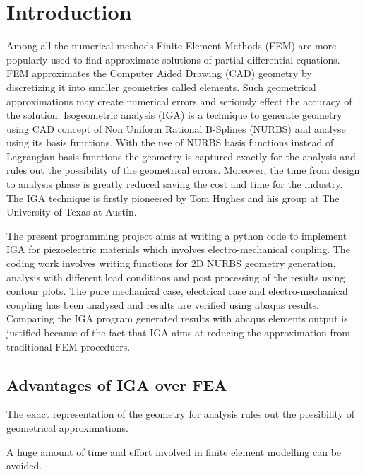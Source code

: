 \documentclass[11pt]{article}
\begin{document}
\section{Introduction}
Among all the numerical methods Finite Element Methods (FEM) are more popularly
used to find approximate solutions of partial differential equations. FEM
approximates the Computer Aided Drawing (CAD) geometry by discretizing it into
smaller geometries called elements. Such geometrical approximations may create
numerical errors and seriously effect the accuracy of the solution.
Isogeometric analysis (IGA) is a technique to generate geometry using CAD
concept of Non Uniform Rational B-Splines (NURBS) and analyse using its basis
functions.
With the use of NURBS basis functions instead of Lagrangian basis functions the geometry is captured exactly for the analysis and rules out the possibility of the geometrical errors. Moreover, the time from design to analysis phase is greatly reduced saving the cost and time for the industry.
The IGA technique is firstly pioneered by Tom Hughes and his group at The
University of Texas at Austin.\\
\par
The present programming project aims at writing a python code to implement IGA for piezoelectric materials which involves electro-mechanical coupling. The coding work involves writing functions for 2D NURBS geometry generation, analysis with different load conditions and post processing of the results using contour plots. The pure mechanical case, electrical case and electro-mechanical coupling has been analysed and results are verified using abaqus results. Comparing the IGA program generated results with abaqus elements output is justified because of the fact that IGA aims at reducing the approximation from traditional FEM proceduers.      


\newpage


\subsection{Advantages of IGA over FEA}
\begin{description}[leftmargin=*]
	\item[$\bullet$]   The exact representation of the geometry for analysis rules
	out the possibility of geometrical approximations.
	\item[$\bullet$]   A huge amount of time and effort involved in finite element modelling
	can be avoided.
\end{description}
\end{document}
